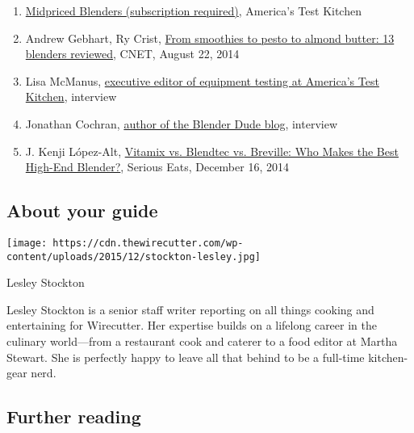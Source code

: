 \begin{enumerate}
\def\labelenumi{\arabic{enumi}.}
\item
  \href{http://www.americastestkitchen.com/equipment_reviews/1383-blenders}{Midpriced
  Blenders (subscription required)}, America's Test Kitchen
\item
  Andrew Gebhart, Ry Crist,
  \href{http://www.cnet.com/news/from-smoothies-to-pesto-seven-blenders-reviewed/}{From
  smoothies to pesto to almond butter: 13 blenders reviewed}, CNET,
  August 22, 2014
\item
  Lisa McManus,
  \href{https://www.americastestkitchen.com/tour}{executive editor of
  equipment testing at America's Test Kitchen}, interview
\item
  Jonathan Cochran, \href{http://blenderdude.com}{author of the Blender
  Dude blog}, interview
\item
  J. Kenji López-Alt,
  \href{http://www.seriouseats.com/2014/12/high-end-blender-test-equipment-breville-vitamix-blendtec-review.html}{Vitamix
  vs. Blendtec vs. Breville: Who Makes the Best High-End Blender?},
  Serious Eats, December 16, 2014
\end{enumerate}

\hypertarget{about-your-guide}{%
\subsection{About your guide}\label{about-your-guide}}

\texttt{[image: https://cdn.thewirecutter.com/wp-content/uploads/2015/12/stockton-lesley.jpg]}

Lesley Stockton

Lesley Stockton is a senior staff writer reporting on all things cooking
and entertaining for Wirecutter. Her expertise builds on a lifelong
career in the culinary world---from a restaurant cook and caterer to a
food editor at Martha Stewart. She is perfectly happy to leave all that
behind to be a full-time kitchen-gear nerd.

\hypertarget{further-reading}{%
\subsection{Further reading}\label{further-reading}}

